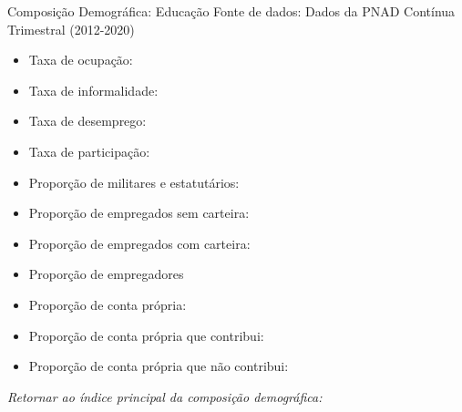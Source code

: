 \begin{frame}[label=_composicao_demografica_educacao]{Composição Demográfica: Educação}
{\footnotesize Fonte de dados: Dados da PNAD Contínua Trimestral (2012-2020)}
\begin{itemize}
\item{Taxa de ocupação: \hyperlink{_composicao_demografica_educacao_taxa_de_ocupacao}{}}
\item{Taxa de informalidade: \hyperlink{_composicao_demografica_educacao_taxa_de_informalidade}{}}
\item{Taxa de desemprego: \hyperlink{_composicao_demografica_educacao_taxa_de_desemprego}{}}
\item{Taxa de participação: \hyperlink{_composicao_demografica_educacao_taxa_de_participacao}{}}
\item{Proporção de militares e estatutários: \hyperlink{_composicao_demografica_educacao_prop_militar}{}}
\item{Proporção de empregados sem carteira: \hyperlink{_composicao_demografica_educacao_prop_empregadoSC}{}}
\item{Proporção de empregados com carteira: \hyperlink{_composicao_demografica_educacao_prop_empregadoCC}{}}
\item{Proporção de empregadores \hyperlink{_composicao_demografica_educacao_prop_empregador}{}}
\item{Proporção de conta própria: \hyperlink{_composicao_demografica_educacao_prop_cpropria}{}}
\item{Proporção de conta própria que contribui: \hyperlink{_composicao_demografica_educacao_prop_cpropriaC}{}}
\item{Proporção de conta própria que não contribui: \hyperlink{_composicao_demografica_educacao_prop_cpropriaNc}{}}
\end{itemize}

\begin{small}
\textit{Retornar ao índice principal da composição demográfica: \hyperlink{_composicao_demografica}{} }
\end{small}

\end{frame}


